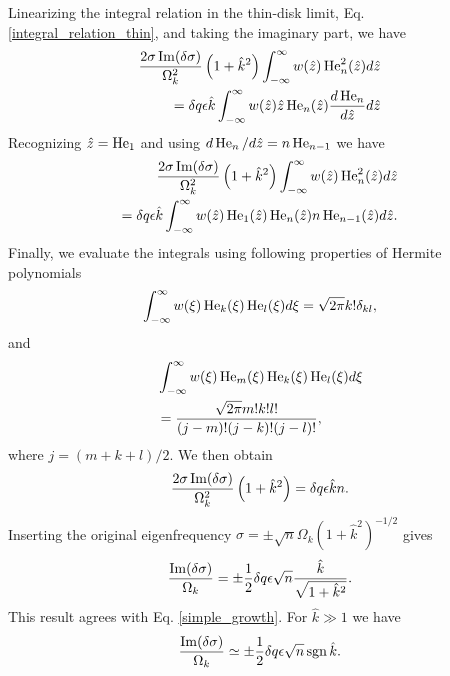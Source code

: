Linearizing the integral relation in the thin-disk limit, Eq. \ref{integral_relation_thin}, and taking the
imaginary part, we have
\begin{align}
  \frac{2\sigma\operatorname{Im}(\delta\sigma)}{\Omega_k^2}
  \left(1+\hat{k}^2\right) \int_{-\infty}^{\infty} w(\hat{z})
  \operatorname{He}_n^2(\hat{z}) d\hat{z} \notag\\
  = \delta q \epsilon \hat{k} 
  \int_{-\infty}^{\infty}
  w(\hat{z})\hat{z}\operatorname{He}_n(\hat{z})\frac{d\operatorname{He}_n}{d\hat{z}} d\hat{z}
\end{align}
Recognizing $\hat{z} = \operatorname{He}_1$ and using $d\operatorname{He}_n/d\hat{z} = n
\operatorname{He}_{n-1}$ we have
 \begin{align}
   \frac{2\sigma\operatorname{Im}(\delta\sigma)}{\Omega_k^2}
   \left(1+\hat{k}^2\right) \int_{-\infty}^{\infty} w(\hat{z})
   \operatorname{He}_n^2(\hat{z}) d\hat{z} \notag\\
   =\delta q \epsilon \hat{k} 
   \int_{-\infty}^{\infty}
   w(\hat{z})\operatorname{He}_1(\hat{z})\operatorname{He}_n(\hat{z})n\operatorname{He}_{n-1}(\hat{z})d\hat{z}. 
 \end{align}
Finally, we evaluate the integrals using following properties of Hermite polynomials
\begin{align}
  \int_{-\infty}^{\infty}
  w(\xi) \operatorname{He}_k(\xi)\operatorname{He}_l(\xi) d\xi = \sqrt{2\pi}k!\delta_{kl}, 
\end{align}
and
\begin{align}
  &\int_{-\infty}^{\infty}
  w(\xi) \operatorname{He}_m(\xi)\operatorname{He}_k(\xi)\operatorname{He}_l(\xi) d\xi\notag\\& =
  \frac{\sqrt{2\pi}m!k!l!}{(j-m)!(j-k)!(j-l)!}, 
\end{align}
where $j = (m+k+l)/2$. We then obtain
 \begin{align}
  \frac{2\sigma\operatorname{Im}(\delta\sigma)}{\Omega_k^2}
  \left(1+\hat{k}^2\right) = \delta q \epsilon \hat{k} n.
 \end{align}
Inserting the original eigenfrequency $\sigma = \pm
\sqrt{n}\Omega_k(1+\hat{k}^2)^{-1/2}$ gives
\begin{align}
  \frac{\operatorname{Im}(\delta\sigma)}{\Omega_k} = \pm \frac{1}{2}\delta q \epsilon
  \sqrt{n} \frac{\hat{k}}{\sqrt{1+\hat{k}^2}}. 
\end{align}
This result agrees with Eq. \ref{simple_growth}.  
For $\hat{k}\gg 1$ we have
\begin{align}
  \frac{\operatorname{Im}(\delta\sigma)}{\Omega_k} \simeq \pm \frac{1}{2}\delta q \epsilon
  \sqrt{n} \operatorname{sgn}{\hat{k}}. 
\end{align}

